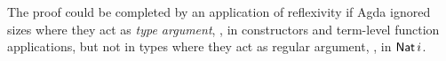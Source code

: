 \begin{code}%
\>[0]\AgdaSpace{}%
\AgdaSymbol{:}\AgdaSpace{}%
\AgdaSpace{}%
\AgdaSpace{}%
\AgdaSpace{}%
\AgdaSymbol{(}\AgdaSpace{}%
\AgdaSymbol{:}\AgdaSpace{}%
\AgdaSpace{}%
\AgdaSymbol{)}\AgdaSpace{}%
\AgdaSpace{}%
\AgdaSpace{}%
\AgdaSpace{}%
\AgdaSpace{}%
\AgdaSpace{}%
\AgdaSpace{}%
\AgdaSpace{}%
\AgdaSpace{}%
\<%
\\
\>[0]\AgdaSpace{}%
\AgdaSpace{}%
\AgdaFunction{+}\AgdaSpace{}%
\AgdaSymbol{)}\AgdaSpace{}%
\AgdaSymbol{(}\AgdaSpace{}%
\AgdaSymbol{)}%
\>[31]\AgdaSymbol{=}%
\>[34]\<%
\\
\>[0]\AgdaSpace{}%
\AgdaSpace{}%
\AgdaFunction{+}\AgdaSpace{}%
\AgdaSymbol{)}\AgdaSpace{}%
\AgdaSymbol{(}\AgdaSpace{}%
\AgdaSpace{}%
\AgdaSymbol{)}%
\>[31]\AgdaSymbol{=}%
\>[34]\AgdaSpace{}%
\AgdaSpace{}%
\<%
\end{code}

The proof could be completed by an application of reflexivity if Agda ignored sizes where they act as \emph{type argument}, \ie, in constructors and term-level function applications, but not in types where they act as regular argument, \eg, in $\aNat\,i$.
